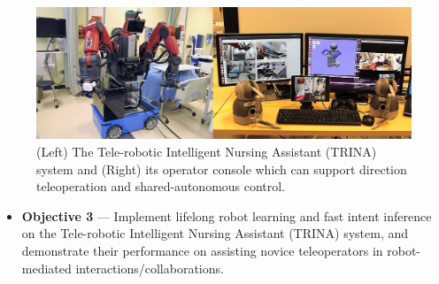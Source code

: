 \documentclass[letterpaper, 11 pt, onecolumn]{article}
\begin{document}
\begin{figure}
  \includegraphics[width=0.99\linewidth]{fig//TRINA_system}
    \caption{(Left) The Tele-robotic Intelligent Nursing Assistant (TRINA) system and (Right) its operator console which can support direction teleoperation and shared-autonomous control.}
    \label{fig:Trina}
\end{figure}
\begin{itemize}
\item \textbf{Objective 3} --- Implement lifelong robot learning and fast intent inference on the Tele-robotic Intelligent Nursing Assistant (TRINA) system, and demonstrate their performance on assisting novice teleoperators in robot-mediated interactions/collaborations. 
\end{itemize}
\end{document}
